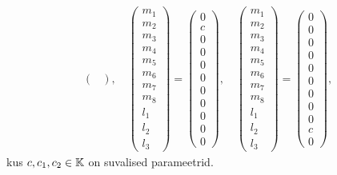 \begin{align*}
\begin{pmatrix}
    \end{pmatrix},
    \quad
    \begin{pmatrix}
        m_1 \\ m_2 \\ m_3 \\ m_4 \\ m_5 \\ m_6 \\ m_7 \\ m_8 \\ l_1 \\ l_2 \\ l_3
    \end{pmatrix} = 
    \begin{pmatrix}
        0 \\ c \\ 0 \\ 0 \\ 0 \\ 0 \\ 0 \\ 0 \\ 0 \\ 0 \\ 0
    \end{pmatrix},
    \quad
    \begin{pmatrix}
        m_1 \\ m_2 \\ m_3 \\ m_4 \\ m_5 \\ m_6 \\ m_7 \\ m_8 \\ l_1 \\ l_2 \\ l_3
    \end{pmatrix} = 
    \begin{pmatrix}
        0 \\ 0 \\ 0 \\ 0 \\ 0 \\ 0 \\ 0 \\ 0 \\ 0 \\ c \\ 0
    \end{pmatrix},
\end{align*}
\renewcommand\arraystretch{1}
kus $c, c_1, c_2 \in \mathbb{K}$ on suvalised parameetrid.
